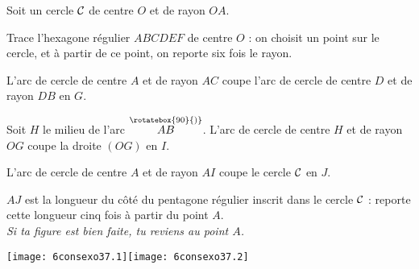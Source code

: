 \begin{myenumerate}
\item Soit un cercle $\cal C$ de centre $O$ et de rayon $OA$.
\item Trace l'hexagone régulier $ABCDEF$ de centre $O$ : on choisit
un point sur le cercle, et à partir de ce point, on reporte six fois le
rayon.
\item L'arc de cercle de centre $A$ et de rayon $AC$ coupe l'arc de
cercle de centre $D$ et de rayon $DB$ en $G$.
\item Soit $H$ le milieu de l'arc
$\stackrel{\rotatebox{90}{)}}{AB}$. L'arc de cercle de centre $H$ et
de rayon $OG$ coupe la droite $(OG)$ en $I$.
\item L'arc de cercle de centre $A$ et de rayon $AI$ coupe le cercle
$\cal C$ en $J$.
\item $AJ$ est la longueur du côté du pentagone régulier inscrit dans
le cercle $\cal C$ : reporte cette longueur cinq fois à partir du point
$A$.\\{\em Si ta figure est bien faite, tu reviens au point $A$.}
\end{myenumerate}
\begin{center}
  \texttt{[image: 6consexo37.1]}\kern1cm\texttt{[image: 6consexo37.2]}
\end{center}